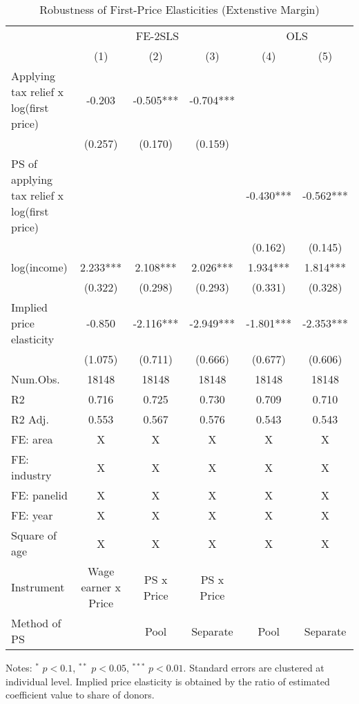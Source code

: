 \documentclass[
  11pt,
  a4paper,
]{article}
\begin{document}
\begin{table}

\caption{\label{tab:robextensive}Robustness of First-Price Elasticities (Extenstive Margin)}
\centering
\fontsize{9}{11}\selectfont
\begin{threeparttable}
\begin{tabular}[t]{lccccc}
\toprule
\multicolumn{1}{c}{ } & \multicolumn{3}{c}{FE-2SLS} & \multicolumn{2}{c}{OLS} \\
\cmidrule(l{3pt}r{3pt}){2-4} \cmidrule(l{3pt}r{3pt}){5-6}
  & (1) & (2) & (3) & (4) & (5)\\
\midrule
Applying tax relief x log(first price) & -0.203 & -0.505*** & -0.704*** &  & \\
 & (0.257) & (0.170) & (0.159) &  & \\
PS of applying tax relief x log(first price) &  &  &  & -0.430*** & -0.562***\\
 &  &  &  & (0.162) & (0.145)\\
log(income) & 2.233*** & 2.108*** & 2.026*** & 1.934*** & 1.814***\\
 & (0.322) & (0.298) & (0.293) & (0.331) & (0.328)\\
\midrule
Implied price elasticity & -0.850 & -2.116*** & -2.949*** & -1.801*** & -2.353***\\
 & (1.075) & (0.711) & (0.666) & (0.677) & (0.606)\\
Num.Obs. & 18148 & 18148 & 18148 & 18148 & 18148\\
R2 & 0.716 & 0.725 & 0.730 & 0.709 & 0.710\\
R2 Adj. & 0.553 & 0.567 & 0.576 & 0.543 & 0.543\\
FE: area & X & X & X & X & X\\
FE: industry & X & X & X & X & X\\
FE: panelid & X & X & X & X & X\\
FE: year & X & X & X & X & X\\
Square of age & X & X & X & X & X\\
Instrument & Wage earner x Price & PS x Price & PS x Price &  & \\
Method of PS &  & Pool & Separate & Pool & Separate\\
\bottomrule
\end{tabular}
\begin{tablenotes}
\item Notes: $^{*}$ $p < 0.1$, $^{**}$ $p < 0.05$, $^{***}$ $p < 0.01$. Standard errors are clustered at individual level. Implied price elasticity is obtained by the ratio of estimated coefficient value to share of donors.
\end{tablenotes}
\end{threeparttable}
\end{table}
\end{document}
